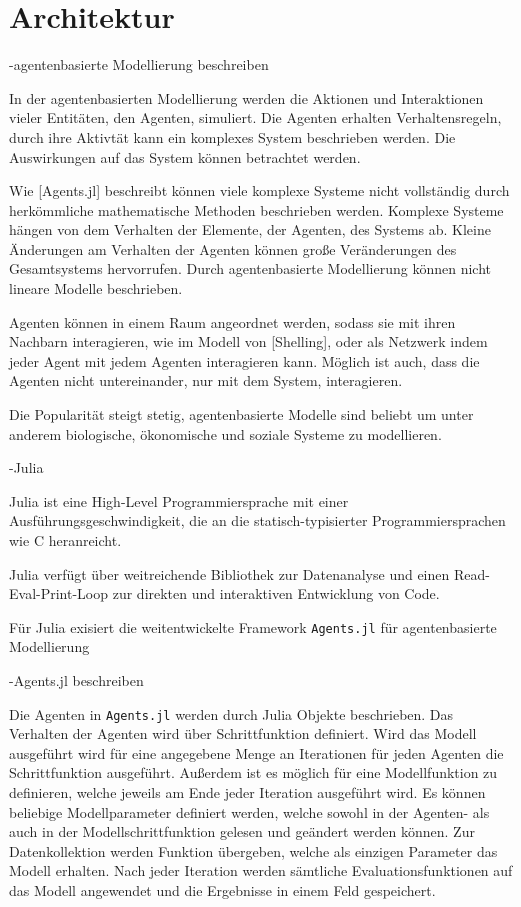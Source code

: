 \chapter{Architektur}

-agentenbasierte Modellierung beschreiben


In der agentenbasierten Modellierung werden die Aktionen und Interaktionen vieler Entitäten, den Agenten, simuliert. Die Agenten erhalten Verhaltensregeln, durch ihre Aktivtät kann ein komplexes System beschrieben werden. Die Auswirkungen auf das System können betrachtet werden.

Wie [Agents.jl] beschreibt können viele komplexe Systeme nicht vollständig durch herkömmliche mathematische Methoden beschrieben werden. Komplexe Systeme hängen von dem Verhalten der Elemente, der Agenten, des Systems ab. Kleine Änderungen am Verhalten der Agenten können große Veränderungen des Gesamtsystems hervorrufen. Durch agentenbasierte Modellierung können nicht lineare Modelle beschrieben.

Agenten können in einem Raum angeordnet werden, sodass sie mit ihren Nachbarn interagieren, wie im Modell von [Shelling], oder als Netzwerk indem jeder Agent mit jedem Agenten interagieren kann. Möglich ist auch, dass die Agenten nicht untereinander, nur mit dem System, interagieren.


Die Popularität steigt stetig, agentenbasierte Modelle sind beliebt um unter anderem biologische, ökonomische und soziale Systeme zu modellieren.

-Julia

Julia ist eine High-Level Programmiersprache mit einer Ausführungsgeschwindigkeit, die an die statisch-typisierter Programmiersprachen wie C heranreicht.

Julia verfügt über weitreichende Bibliothek zur Datenanalyse und einen Read-Eval-Print-Loop zur direkten und interaktiven Entwicklung von Code.

Für Julia exisiert die weitentwickelte Framework \texttt{Agents.jl} für agentenbasierte Modellierung

-Agents.jl beschreiben

Die Agenten in \texttt{Agents.jl} werden durch Julia Objekte beschrieben. Das Verhalten der Agenten wird über Schrittfunktion definiert. Wird das Modell ausgeführt wird für eine angegebene Menge an Iterationen für jeden Agenten die Schrittfunktion ausgeführt. Außerdem ist es möglich für eine Modellfunktion zu definieren, welche jeweils am Ende jeder Iteration ausgeführt wird. Es können beliebige Modellparameter definiert werden, welche sowohl in der Agenten- als auch in der Modellschrittfunktion gelesen und geändert werden können. Zur Datenkollektion werden Funktion übergeben, welche als einzigen Parameter das Modell erhalten. Nach jeder Iteration werden sämtliche Evaluationsfunktionen auf das Modell angewendet und die Ergebnisse in einem Feld gespeichert.


